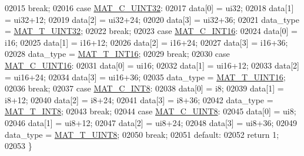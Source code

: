 \begin{DoxyCode}
{{{{{02015             \textcolor{keywordflow}{break};
02016         \textcolor{keywordflow}{case} \hyperlink{group___m_a_t_ggad4d60ae7b709fc81bfd744fb4c857c40a9a17a7edd45b19ef68197db81b27e816}{MAT\_C\_UINT32}:
02017             data[0] = ui32;
02018             data[1] = ui32+12;
02019             data[2] = ui32+24;
02020             data[3] = ui32+36;
02021             data\_type = \hyperlink{group___m_a_t_ggacf7b3b879282b7ab3a51190e49bf3453aa397e285a23fe240368b752897652c6a}{MAT\_T\_UINT32};
02022             \textcolor{keywordflow}{break};
02023         \textcolor{keywordflow}{case} \hyperlink{group___m_a_t_ggad4d60ae7b709fc81bfd744fb4c857c40a40370e9de516c5036a67a5865c071006}{MAT\_C\_INT16}:
02024             data[0] = i16;
02025             data[1] = i16+12;
02026             data[2] = i16+24;
02027             data[3] = i16+36;
02028             data\_type = \hyperlink{group___m_a_t_ggacf7b3b879282b7ab3a51190e49bf3453a8c5b2e381946e95ea8d81ac216743302}{MAT\_T\_INT16};
02029             \textcolor{keywordflow}{break};
02030         \textcolor{keywordflow}{case} \hyperlink{group___m_a_t_ggad4d60ae7b709fc81bfd744fb4c857c40a8bede21dbf6c1edc0bbccc1481bccae7}{MAT\_C\_UINT16}:
02031             data[0] = ui16;
02032             data[1] = ui16+12;
02033             data[2] = ui16+24;
02034             data[3] = ui16+36;
02035             data\_type = \hyperlink{group___m_a_t_ggacf7b3b879282b7ab3a51190e49bf3453a05bc7af7680aa68be95126ae0a4c2e31}{MAT\_T\_UINT16};
02036             \textcolor{keywordflow}{break};
02037         \textcolor{keywordflow}{case} \hyperlink{group___m_a_t_ggad4d60ae7b709fc81bfd744fb4c857c40a984ff310f9e906100fcff95f704f43c5}{MAT\_C\_INT8}:
02038             data[0] = i8;
02039             data[1] = i8+12;
02040             data[2] = i8+24;
02041             data[3] = i8+36;
02042             data\_type = \hyperlink{group___m_a_t_ggacf7b3b879282b7ab3a51190e49bf3453a9807f5033ed4f9b548953742d9fd1658}{MAT\_T\_INT8};
02043             \textcolor{keywordflow}{break};
02044         \textcolor{keywordflow}{case} \hyperlink{group___m_a_t_ggad4d60ae7b709fc81bfd744fb4c857c40a81270f8093cb4808e992c1d29d84d4e3}{MAT\_C\_UINT8}:
02045             data[0] = ui8;
02046             data[1] = ui8+12;
02047             data[2] = ui8+24;
02048             data[3] = ui8+36;
02049             data\_type = \hyperlink{group___m_a_t_ggacf7b3b879282b7ab3a51190e49bf3453a01c1bd7db68f90552862eb5d311be408}{MAT\_T\_UINT8};
02050             \textcolor{keywordflow}{break};
02051         \textcolor{keywordflow}{default}:
02052             \textcolor{keywordflow}{return} 1;
02053     \}
}}}}}
\end{DoxyCode}
